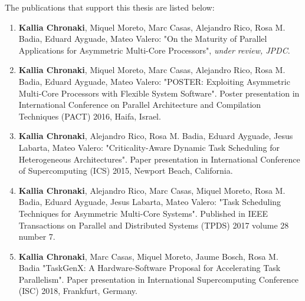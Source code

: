The publications that support this thesis are listed below:
\begin{enumerate}
	\item \textbf{Kallia Chronaki}, Miquel Moreto, Marc Casas, Alejandro Rico, Rosa M. Badia, Eduard Ayguade, Mateo Valero: "On the Maturity of Parallel Applications for Asymmetric Multi-Core Processors", \textit{under review, JPDC}.
	\item \cite{PACT_poster} \textbf{Kallia Chronaki}, Miquel Moreto, Marc Casas, Alejandro Rico, Rosa M. Badia, Eduard Ayguade, Mateo Valero: "POSTER: Exploiting Asymmetric Multi-Core Processors with Flexible System Software". Poster presentation in International Conference on Parallel Architecture and Compilation Techniques (PACT) 2016, Haifa, Israel.
	\item \cite{Chronaki:ICS2015} \textbf{Kallia Chronaki}, Alejandro Rico, Rosa M. Badia, Eduard Ayguade, Jesus Labarta, Mateo Valero: "Criticality-Aware Dynamic Task Scheduling for Heterogeneous Architectures".
	Paper presentation in International Conference of Supercomputing (ICS) 2015, Newport Beach, California.
	\item \cite{Chronaki:TPDS} \textbf{Kallia Chronaki}, Alejandro Rico, Marc Casas, Miquel Moreto, Rosa M. Badia, Eduard Ayguade, Jesus Labarta, Mateo Valero: "Task Scheduling Techniques for Asymmetric Multi-Core Systems". 
	Published in IEEE Transactions on Parallel and Distributed Systems (TPDS) 2017 volume 28 number 7.
	\item \cite{Chronaki:ISC} \textbf{Kallia Chronaki}, Marc Casas, Miquel Moreto, Jaume Bosch, Rosa M. Badia "TaskGenX: A Hardware-Software Proposal for Accelerating Task Parallelism".
	Paper presentation in International Supercomputing Conference (ISC) 2018, Frankfurt, Germany.
\end{enumerate}

